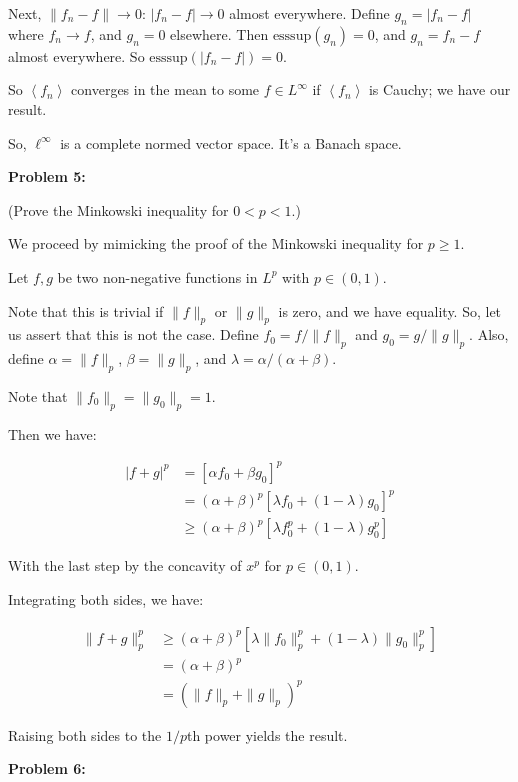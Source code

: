 \documentclass[a4paper,12pt]{article}
\newcommand{\tab}{\hspace{4mm}} %
\newcommand{\shunt}{\vspace{20mm}}
\newcommand{\absval}[1]{\left\lvert #1 \right\rvert}
\newcommand{\norm}[1]{\|#1\|}
\newcommand{\anbrack}[1]{\left\langle #1 \right\rangle}
\newcommand{\al}{\alpha} %
\newcommand{\be}{\beta}
\newcommand{\la}{\lambda}
\begin{document}
\tab Next, $\norm{f_n - f} \to 0$: $\absval{f_n-f} \to 0$ almost everywhere. Define $g_n = \absval{f_n-f}$ where $f_n \to f$, and $g_n = 0$ elsewhere. Then $\text{esssup}(g_n)=0$, and $g_n = f_n-f$ almost everywhere. So $\text{esssup}(\absval{f_n-f})=0$.

\tab So $\anbrack{f_n}$ converges in the mean to some $f \in L^\infty$ if $\anbrack{f_n}$ is Cauchy; we have our result.


So, $\ell^\infty$ is a complete normed vector space. It's a Banach space.

\shunt

{\bf Problem 5:} 

(Prove the Minkowski inequality for $0 < p < 1$.)

We proceed by mimicking the proof of the Minkowski inequality for $p \geq 1$. 

Let $f,g$ be two non-negative functions in $L^p$ with $p \in (0,1)$.

Note that this is trivial if $\norm{f}_p$ or $\norm{g}_p$ is zero, and we have equality. So, let us assert that this is not the case. Define $f_0=f/\norm{f}_p$ and $g_0=g/\norm{g}_p$. Also, define $\al = \norm{f}_p$, $\be=\norm{g}_p$, and $\la = \al/(\al+\be)$.

Note that $\norm{f_0}_p=\norm{g_0}_p=1$.

Then we have:

\begin{align*}
\absval{f+g}^p &= [\al f_0 + \be g_0]^p\\
&= (\al+\be)^p[\la f_0 + (1-\la) g_0]^p\\
&\geq (\al+\be)^p[\la f_0^p + (1-\la) g_0^p]
\end{align*}

With the last step by the concavity of $x^p$ for $p \in (0,1)$.

Integrating both sides, we have:

\begin{align*}
\norm{f+g}_p^p &\geq (\al+\be)^p[\la \norm{f_0}_p^p+(1-\la)\norm{g_0}_p^p]\\
&=(\al+\be)^p\\
&=(\norm{f}_p+\norm{g}_p)^p
\end{align*}

Raising both sides to the $1/p$th power yields the result. 

\shunt

{\bf Problem 6:} 
\end{document}
